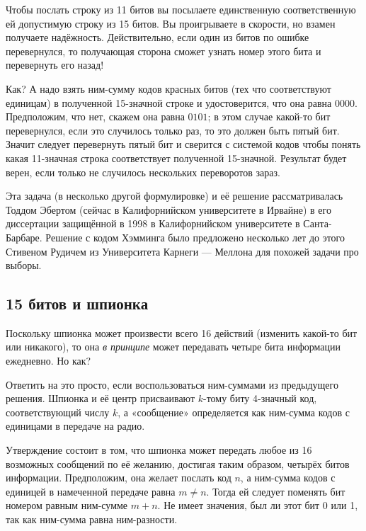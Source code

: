 Чтобы послать строку из 11 битов вы посылаете единственную соответственную ей допустимую строку из 15 битов.
Вы проигрываете в скорости, но взамен получаете надёжность.
Действительно, если один из битов по ошибке перевернулся, то получающая сторона сможет узнать номер этого бита и перевернуть его назад!

Как? А надо взять ним-сумму кодов красных битов (тех что соответствуют единицам) в полученной 15-значной строке и удостоверится, что она равна $0000$.
Предположим, что нет, скажем она равна $0101$;
в этом случае какой-то бит перевернулся, если это случилось только раз, то это должен быть пятый бит.
Значит следует перевернуть пятый бит и сверится с системой кодов чтобы понять какая 11-значная строка соответствует полученной 15-значной.
Результат будет верен, если только не случилось нескольких переворотов зараз.

\medskip

Эта задача (в несколько другой формулировке) и её решение рассматривалась Тоддом Эбертом (сейчас в Калифорнийском университете в Ирвайне) в его диссертации защищённой в 1998 в Калифорнийском университете в Санта-Барбаре.
Решение с кодом Хэмминга было предложено несколько лет до этого Стивеном Рудичем из Университета Карнеги — Меллона  для похожей задачи про выборы.

\subsection*{15 битов и шпионка}

Поскольку шпионка может произвести всего 16 действий (изменить какой-то бит или никакого), то она \emph{в принципе} может передавать четыре бита информации ежедневно.
Но как?

Ответить на это просто, если воспользоваться ним-суммами из предыдущего решения.
Шпионка и её центр присваивают $k$-тому биту 4-значный код, соответствующий числу $k$, а «сообщение» определяется как ним-сумма кодов с единицами в передаче на радио.

Утверждение состоит в том, что шпионка может передать любое из 16 возможных сообщений по её желанию,
достигая таким образом, четырёх битов информации.
Предположим, она желает послать код $n$, а ним-сумма кодов с единицей в намеченной передаче равна $m\ne n$.
Тогда ей следует поменять бит номером равным ним-сумме $m+n$.
Не имеет значения, был ли этот бит 0 или 1, так как ним-сумма равна ним-разности.
\heart

\medskip

